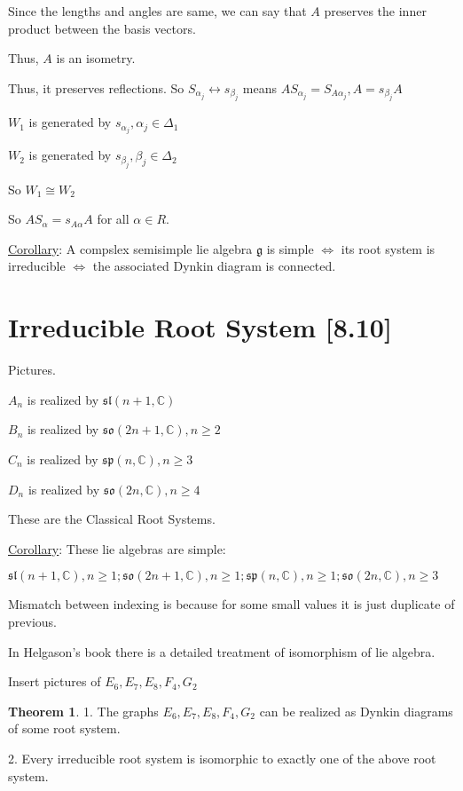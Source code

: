 \documentclass{article}
\theoremstyle{definition}
\newtheorem{theorem}{Theorem}
\begin{document}
Since the lengths and angles are same, we can say that \(A\) preserves the inner product between the basis vectors.

Thus, \(A\) is an isometry.

Thus, it preserves reflections. So \(S_{\alpha_j}\leftrightarrow s_{\beta_j}\) means \(AS_{\alpha_j}=S_{A \alpha_j}, A = s_{\beta_j}A\) 

\(W_1\) is generated by \(s_{\alpha_j},\alpha _j\in \Delta_1\) 

\(W_2\) is generated by \(s_{\beta_j},\beta_j\in \Delta_2\) 

So \(W_1\cong W_2\) 

So \(AS_{\alpha}=s_{A \alpha}A\) for all \(\alpha \in R\).

\underline{Corollary}: A compslex semisimple lie algebra \(\mathfrak{g}\) is simple \(\iff\) its root system is irreducible \(\iff\) the associated Dynkin diagram is connected.

\section*{Irreducible Root System [8.10]}

Pictures.

\(A_n\) is realized by \(\mathfrak{sl}(n+1,\mathbb{C})\) 

\(B_n\) is realized by \(\mathfrak{so}(2n+1,\mathbb{C}),n\geq 2\)

\(C_n\) is realized by \(\mathfrak{sp}(n,\mathbb{C}),n\geq 3 \) 

\(D_n\) is realized by \(\mathfrak{so}(2n,\mathbb{C}),n\geq 4 \) 

These are the Classical Root Systems.

\underline{Corollary}: These lie algebras are simple:

\(\mathfrak{sl}(n+1,\mathbb{C}),n\geq 1; \mathfrak{so}(2n+1,\mathbb{C}),n\geq 1; \mathfrak{sp}(n,\mathbb{C}),n\geq 1; \mathfrak{so}(2n,\mathbb{C}),n\geq 3    \) 

Mismatch between indexing is because for some small values it is just duplicate of previous.

In Helgason's book there is a detailed treatment of isomorphism of lie algebra.

Insert pictures of \(E_6, E_7, E_8, F_4, G_2\)

\begin{theorem}

    1. The graphs \(E_6, E_7, E_8, F_4, G_2\) can be realized as Dynkin diagrams of some root system.

    2. Every irreducible root system is isomorphic to exactly  one of the above root system.

\end{theorem}
\end{document}
